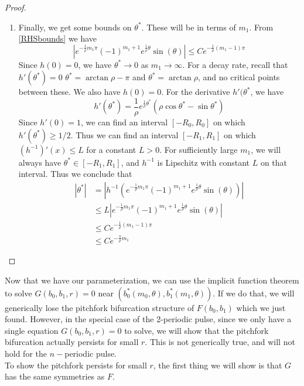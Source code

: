\documentclass[thesis.tex]{subfiles}
\begin{document}
\begin{lemma}
\begin{proof}
\begin{enumerate}
\begin{enumerate}
		\item Finally, we get some bounds on $\theta^*$. These will be in terms of $m_1$. From \eqref{RHSbounds} we have
		\[
		|e^{ -\frac{1}{\rho} m_1 \pi } (-1)^{m_1 + 1}  e^{ \frac{1}{\rho} \theta } \sin(\theta)| \leq C e^{ -\frac{1}{\rho}(m_1 - 1) \pi }
		\]
		Since $h(0) = 0$, we have $\theta^* \rightarrow 0$ as $m_1 \rightarrow \infty$. For a decay rate, recall that $h'(\theta^*) = 0$  $\theta^* = \arctan{\rho} - \pi$ and $\theta^* = \arctan{\rho}$, and no critical points between these. We also have $h(0) = 0$. For the derivative $h'(\theta^*$, we have
		\[
		h'(\theta^*) = \frac{1}{\rho}e^{\frac{1}{\rho}\theta^*}(\rho \cos \theta^* - \sin \theta^*)
		\]
		Since $h'(0) = 1$, we can find an interval $[-R_0,R_0]$ on which $h'(\theta^*) \geq 1/2$. Thus we can find an interval $[-R_1, R_1]$ on which $(h^{-1})'(x) \leq L$ for a constant $L > 0$. For sufficiently large $m_1$, we will always have $\theta^* \in [-R_1, R_1]$, and $h^{-1}$ is Lipschitz with constant $L$ on that interval. Thus we conclude that
		\begin{align*}
		|\theta^*| &= | h^{-1}(e^{ -\frac{1}{\rho} m_1 \pi } (-1)^{m_1 + 1}  e^{ \frac{1}{\rho} \theta } \sin(\theta)) | \\
		&\leq L |e^{ -\frac{1}{\rho} m_1 \pi } (-1)^{m_1 + 1}  e^{ \frac{1}{\rho} \theta } \sin(\theta)| \\
		&\leq C e^{ -\frac{1}{\rho}(m_1 - 1) \pi } \\
		&\leq C e^{ -\frac{\pi}{\rho} m_1 }
		\end{align*}

	\end{enumerate}
\end{enumerate}

\end{proof}
\end{lemma}

Now that we have our parameterization, we can use the implicit function theorem to solve $G(b_0, b_1, r) = 0$ near $(b_0^*(m_0, \theta), b_1^*(m_1, \theta))$. If we do that, we will generically lose the pitchfork bifurcation structure of $F(b_0, b_1)$ which we just found. However, in the special case of the 2-periodic pulse, since we only have a single equation $G(b_0, b_1, r) = 0$ to solve, we will show that the pitchfork bifurcation actually persists for small $r$. This is not generically true, and will not hold for the $n-$periodic pulse.\\

To show the pitchfork persists for small $r$, the first thing we will show is that $G$ has the same symmetries as $F$.
\end{document}

